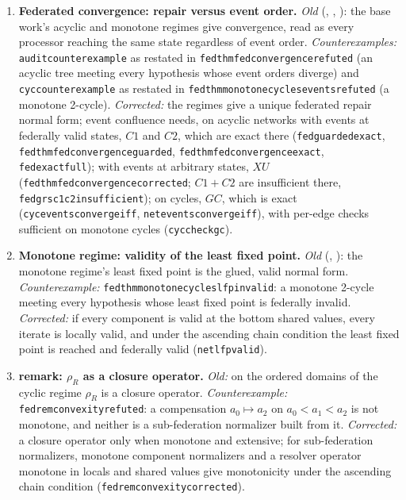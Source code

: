 \documentclass[11pt,a4paper]{article}
\theoremstyle{plain}
\theoremstyle{definition}
\theoremstyle{remark}
\renewcommand{\_}{\origunderscore\allowbreak}
\begin{document}
\begin{enumerate}[leftmargin=*, label=\textbf{E\arabic*.}]
\item \textbf{Federated convergence: repair versus event order.}
  \emph{Old} (, , ): the base work's acyclic and
  monotone regimes give convergence, read as every processor reaching the same state regardless of
  event order. \emph{Counterexamples:} \texttt{audit\_counterexample} as restated in
  \texttt{fed\_thm\_fed\_convergence\_refuted} (an acyclic tree meeting every hypothesis whose event
  orders diverge) and \texttt{cyc\_counterexample} as restated in
  \texttt{fed\_thm\_monotone\_cycles\_events\_refuted} (a monotone 2-cycle). \emph{Corrected:} the
  regimes give a unique federated repair normal form; event confluence needs, on acyclic networks
  with events at federally valid states, $C1$ and $C2$, which are exact there
  (\texttt{fed\_guarded\_exact}, \texttt{fed\_thm\_fed\_convergence\_guarded},
  \texttt{fed\_thm\_fed\_convergence\_exact}, \texttt{fed\_exact\_full}); with events at arbitrary
  states, $XU$ (\texttt{fed\_thm\_fed\_convergence\_corrected}; $C1 + C2$ are insufficient there,
  \texttt{fed\_grs\_c1\_c2\_insufficient}); on cycles, $GC$, which is exact
  (\texttt{cyc\_events\_converge\_iff}, \texttt{net\_events\_converge\_iff}), with per-edge checks
  sufficient on monotone cycles (\texttt{cyc\_check\_gc}).

\item \textbf{Monotone regime: validity of the least fixed point.}
  \emph{Old} (, ): the monotone regime's least fixed point is the
  glued, valid normal form. \emph{Counterexample:}
  \texttt{fed\_thm\_monotone\_cycles\_lfp\_invalid}: a monotone 2-cycle meeting every hypothesis whose
  least fixed point is federally invalid. \emph{Corrected:} if every component is valid at the bottom
  shared values, every iterate is locally valid, and under the ascending chain condition the least
  fixed point is reached and federally valid (\texttt{net\_lfp\_valid}).

\item \textbf{ remark: $\rho_R$ as a closure operator.}
  \emph{Old:} on the ordered domains of the cyclic regime $\rho_R$ is a closure operator.
  \emph{Counterexample:} \texttt{fed\_rem\_convexity\_refuted}: a compensation $a_0 \mapsto a_2$ on
  $a_0 < a_1 < a_2$ is not monotone, and neither is a sub-federation normalizer built from it.
  \emph{Corrected:} a closure operator only when monotone and extensive; for sub-federation
  normalizers, monotone component normalizers and a resolver operator monotone in locals and shared
  values give monotonicity under the ascending chain condition (\texttt{fed\_rem\_convexity\_corrected}).


\end{enumerate}
\end{document}

